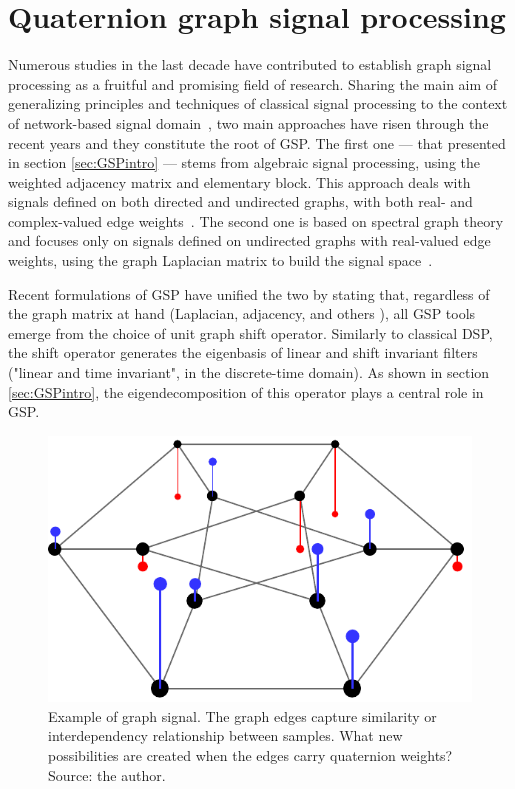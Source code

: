 



\chapter{Quaternion graph signal processing}
\label{ch:QGSP}

Numerous studies in the last decade have contributed to establish graph signal processing as a fruitful and promising field of research. Sharing the main aim of generalizing principles and techniques of classical signal processing to the context of network-based signal domain~\cite{ortega2018graph}, two main approaches have risen through the recent years and they constitute the root of GSP. The first one --- that presented in section \ref{sec:GSPintro} --- stems from algebraic signal processing, using the weighted adjacency matrix and elementary block. This approach deals with signals defined on both directed and undirected graphs, with both real- and complex-valued edge weights~\cite{sandryhaila2014big}. The second one is based on spectral graph theory and focuses only on signals defined on undirected graphs with real-valued edge weights, using the graph Laplacian matrix to build the signal space~\cite{shuman2013emerging}.

Recent formulations of GSP have unified the two by stating that, regardless of the graph matrix at hand (Laplacian, adjacency, and others \cite{chen2018shift, dees2019unitary}), all GSP tools emerge from the choice of unit graph shift operator. Similarly to classical DSP, the shift operator generates the eigenbasis of linear and shift invariant filters ("linear and time invariant", in the discrete-time domain).
As shown in section \ref{sec:GSPintro}, the eigendecomposition of this operator plays a central role in GSP.

\begin{figure}
	\centering
	\includegraphics[width=0.3\linewidth]{Figures/signal_duher_graph_2.pdf}
	\caption{Example of graph signal. The graph edges capture similarity or interdependency relationship between samples. What new possibilities are created when the edges carry quaternion weights? Source: the author.}
	\label{fig:duher}
\end{figure}

